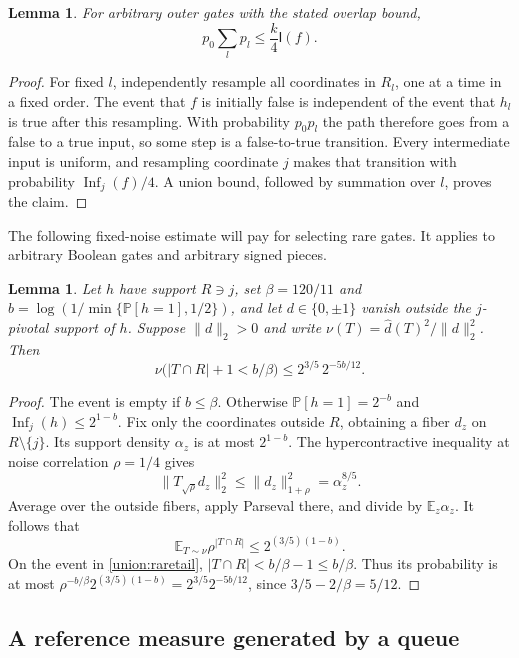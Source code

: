 \documentclass[11pt]{amsart}
\newtheorem{lemma}[theorem]{Lemma}
\theoremstyle{definition}
\theoremstyle{remark}
\newcommand{\E}{\mathbb E}
\renewcommand{\P}{\mathbb P}
\newcommand{\I}{\mathsf I}
\DeclareMathOperator{\Inf}{Inf}
\newcommand{\wh}[1]{\widehat{#1}}
\begin{document}
\begin{lemma}\label{union:path}
For arbitrary outer gates with the stated overlap bound,
\[
 p_0\sum_l p_l\le\frac{k}{4}\I(f).
\]
\end{lemma}
\begin{proof}
For fixed $l$, independently resample all coordinates in $R_l$, one at a time in a fixed order.
The event that $f$ is initially false is independent of the event that $h_l$ is true after this resampling.
With probability $p_0p_l$ the path therefore goes from a false to a true input, so some step is a false-to-true transition.
Every intermediate input is uniform, and resampling coordinate $j$ makes that transition with probability $\Inf_j(f)/4$.
A union bound, followed by summation over $l$, proves the claim.
\end{proof}

The following fixed-noise estimate will pay for selecting rare gates.
It applies to arbitrary Boolean gates and arbitrary signed pieces.

\begin{lemma}\label{union:rare}
Let $h$ have support $R\ni j$, set $\beta=120/11$ and $b=\log(1/\min\{\P[h=1],1/2\})$, and let $d\in\{0,\pm1\}$ vanish outside the $j$-pivotal support of $h$.
Suppose $\|d\|_2>0$ and write $\nu(T)=\wh d(T)^2/\|d\|_2^2$.
Then
\begin{equation}\label{union:raretail}
 \nu\bigl(|T\cap R|+1<b/\beta\bigr)
 \le 2^{3/5}\,2^{-5b/12}.
\end{equation}
\end{lemma}
\begin{proof}
The event is empty if $b\le\beta$.
Otherwise $\P[h=1]=2^{-b}$ and $\Inf_j(h)\le2^{1-b}$.
Fix only the coordinates outside $R$, obtaining a fiber $d_z$ on $R\setminus\{j\}$.
Its support density $\alpha_z$ is at most $2^{1-b}$.
The hypercontractive inequality \cite{Bonami70,Beckner75,OD14} at noise correlation $\rho=1/4$ gives
\[
 \|T_{\sqrt{\rho}}d_z\|_2^2
 \le\|d_z\|_{1+\rho}^2=\alpha_z^{8/5}.
\]
Average over the outside fibers, apply Parseval there, and divide by $\E_z\alpha_z$.
It follows that
\[
 \E_{T\sim\nu}\rho^{|T\cap R|}
 \le 2^{(3/5)(1-b)}.
\]
On the event in \eqref{union:raretail}, $|T\cap R|<b/\beta-1\le b/\beta$.
Thus its probability is at most
$\rho^{-b/\beta}2^{(3/5)(1-b)}=2^{3/5}2^{-5b/12}$, since $3/5-2/\beta=5/12$.
\end{proof}

\subsection{A reference measure generated by a queue}
\end{document}
